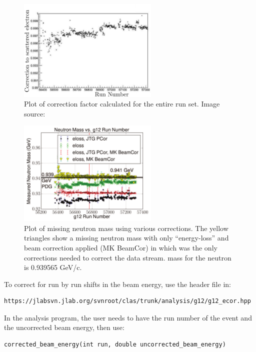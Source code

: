 \begin{figure}\begin{center}
\includegraphics[width=0.6\textwidth]{figures/calib/tag/ecor/beam_cor.eps}
\caption[Beam Correction Factors for Entire  Runs]{\label{fig:beamcor.run} Plot of correction factor calculated for the entire  run set. Image source:~\cite{clas.thesis.kunkel}}
\end{center}\end{figure}

\begin{figure}\begin{center}
\includegraphics[width=0.6\textwidth]{figures/calib/tag/ecor/C3pi_allcorr_neutron_rxr.pdf}
\caption[Corrected Missing Neutron Mass for  Using Beam Corrections]{\label{fig:neutron.fixall} Plot of missing neutron mass using various corrections. The yellow triangles show a missing neutron mass with only ``energy-loss'' and beam correction applied (MK BeamCor) in which was the only corrections needed to correct the  data stream.  mass for the neutron is 0.939565 GeV/c.}
\end{center}\end{figure}



To correct for run by run shifts in the beam energy, use the header file in:
\begin{verbatim}
https://jlabsvn.jlab.org/svnroot/clas/trunk/analysis/g12/g12_ecor.hpp
\end{verbatim}

In the analysis program, the user needs to have the run number of the event and the uncorrected beam energy, then use:
\begin{verbatim}
corrected_beam_energy(int run, double uncorrected_beam_energy)
\end{verbatim}


\FloatBarrier
